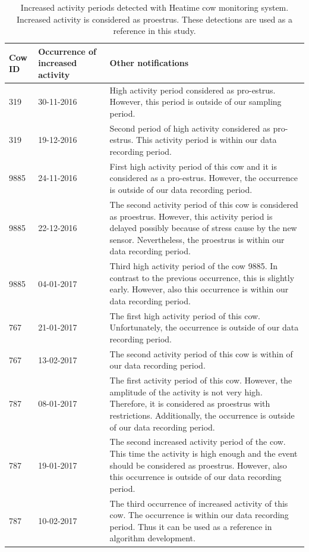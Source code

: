 \documentclass[english,12pt,a4paper,pdftex,elec,utf8]{aaltothesis}
\begin{document}
\begin{table} \caption{Increased activity periods detected with Heatime cow monitoring system. Increased activity is considered as proestrus. These detections are used as a reference in this study.}
\centering
\begin{tabular}{| p{1.25cm} | p{2.25cm} | p{9 cm} |}
\hline
\textbf{Cow ID} & \textbf{Occurrence of increased activity} & \textbf{Other notifications} \\  \hline
319 & 30-11-2016 & High activity period considered as pro-estrus. However, this period is outside of our sampling period. \\ \hline
319 & 19-12-2016 &  Second period of high activity considered as pro-estrus. This activity period is within our data recording period.  \\ \hline
9885 & 24-11-2016 & First high activity period of this cow and it is considered as a pro-estrus. However, the occurrence is outside of our data recording period.  \\ \hline
9885  & 22-12-2016  & The second activity period of this cow is considered as proestrus. However, this activity period is delayed possibly because of stress cause by the new sensor. Nevertheless, the proestrus is within our data recording period.  \\ \hline
9885  & 04-01-2017  & Third high activity period of the cow 9885. In contrast to the previous occurrence, this is slightly early. However, also this occurrence is within our data recording period.  \\ \hline
 767 &  21-01-2017 & The first high activity period of this cow. Unfortunately, the occurrence is outside of our data recording period.  \\ \hline
 767 & 13-02-2017  & The second activity period of this cow is within of our data recording period.  \\ \hline
 787 & 08-01-2017 &  The first activity period of this cow. However, the amplitude of the activity is not very high. Therefore, it is considered as proestrus with restrictions. Additionally, the occurrence is outside of our data recording period. \\ \hline
 787 & 19-01-2017  & The second increased activity period of the cow. This time the activity is high enough and the event should be considered as proestrus. However, also this occurrence is outside of our data recording period.  \\ \hline
 787 & 10-02-2017  &  The third occurrence of increased activity of this cow. The occurrence is within our data recording period. Thus it can be used as a reference in algorithm development. \\ \hline
\end{tabular}
\end{table}
\end{document}
